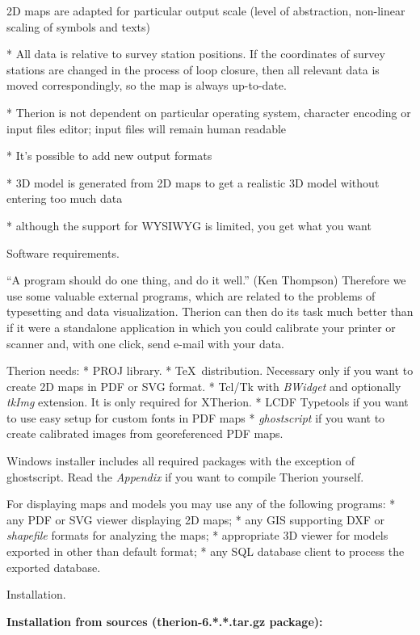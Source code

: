   2D maps are adapted for particular output scale (level of abstraction,
  non-linear scaling of symbols and texts)

* All data is relative to survey station positions. If the coordinates
  of survey stations are changed in the process of loop closure, then all relevant
  data is moved correspondingly, so the map is always up-to-date.

* Therion is not dependent on particular operating system, character encoding
  or input files editor; input files will remain human readable

* It's possible to add new output formats

* 3D model is generated from 2D maps to get a realistic 3D model
  without entering too much data

* although the support for WYSIWYG is limited, you get what you want
\endlist

\subchapter Software requirements.

``A program should do one thing, and do it well.'' (Ken Thompson)
Therefore we use some valuable external programs, which are related to the
problems of typesetting and data visualization. Therion can then do its task
much better than if it were a standalone application in which you could calibrate
your printer or scanner and, with one click, send e-mail with your data.

Therion needs:
\list
* PROJ library.
* \TeX\ distribution.
  Necessary only if you want to create 2D maps in PDF or SVG format.
* Tcl/Tk with {\it BWidget} and optionally {\it tkImg}
  extension. It is only required for XTherion.
* LCDF Typetools if you want to use easy setup for custom fonts in PDF maps
* {\it ghostscript} if you want to create calibrated images from georeferenced
  PDF maps.
\endlist

Windows installer includes all required packages with the exception of {ghostscript}.
Read the {\it Appendix} if you want to compile Therion yourself.

For displaying maps and models you may use any of the following programs:
\list
* any PDF or SVG viewer displaying 2D maps;
* any GIS supporting DXF or {\it shapefile} formats for analyzing the maps;
* appropriate 3D viewer for models exported in other than default format;
* any SQL database client to process the exported database.
\endlist


\subchapter Installation.

{\bf Installation from sources (therion-6.*.*.tar.gz package):}

